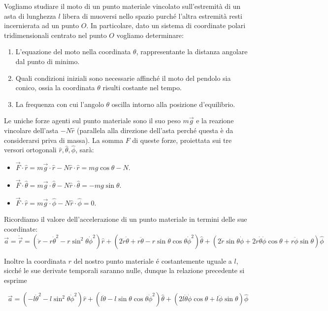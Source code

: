 \documentclass[../main.tex]{subfiles}
\begin{document}

\textex

Vogliamo studiare il moto di un punto materiale vincolato sull'estremità di un asta di lunghezza $l$ libera di muoversi nello spazio purché l'altra estremità resti incernierata ad un punto $O$.
In particolare, dato un sistema di coordinate polari tridimensionali centrato nel punto $O$ vogliamo determinare:
\begin{enumerate}
\item L'equazione del moto nella coordinata $\theta$, rappresentante la distanza angolare dal punto di minimo.
\item Quali condizioni iniziali sono necessarie affinché il moto del pendolo sia conico, ossia la coordinata $\theta$ risulti costante nel tempo.
\item La frequenza con cui l'angolo $\theta$ oscilla intorno alla posizione d'equilibrio.
\end{enumerate}

\solution
Le uniche forze agenti sul punto materiale sono il suo peso $m\vec{g}$ e la reazione vincolare dell'asta $-N\hat{r}$ (parallela alla direzione dell'asta perch\'e questa \`e da considerarsi priva di massa).
La somma $F$ di queste forze, proiettata sui tre versori ortogonali $\hat{r}, \hat{\theta}, \hat{\phi}$, sar\`a:
\begin{itemize}
 \item $\vec{F}\cdot\hat{r}=m\vec{g}\cdot\hat{r}-N\hat{r}\cdot\hat{r}=mg\cos\theta -N$.
 \item $\vec{F}\cdot\hat{\theta}=m\vec{g}\cdot\hat{\theta}-N\hat{r}\cdot\hat{\theta}=-mg\sin\theta$.
 \item $\vec{F}\cdot\hat{r}=m\vec{g}\cdot\hat{\phi}-N\hat{r}\cdot\hat{\phi}=0$.
\end{itemize}

Ricordiamo il valore dell'accelerazione di un punto materiale in termini delle sue coordinate:
$$ \vec{a}=\ddot{\vec{r}}=(\ddot{r}-r\dot{\theta}^2-r\sin^2{\theta}\dot{\phi}^2)\hat{r}+(2\dot{r}\dot{\theta}+r\ddot{\theta}-r\sin\theta\cos\theta\dot{\phi}^2)\hat{\theta}+(2\dot{r}\sin\theta\dot{\phi}+2r\dot{\theta}\dot{\phi}\cos\theta+r\ddot{\phi}\sin\theta)\hat{\phi} $$

Inoltre la coordinata $r$ del nostro punto materiale \'e costantemente uguale a $l$, sicch\'e le sue derivate temporali saranno nulle, dunque la relazione precedente si esprime

$$\vec{a}=(-l\dot{\theta}^2-l\sin^2{\theta}\dot{\phi}^2)\hat{r}+(l\ddot{\theta}-l\sin\theta\cos\theta\dot{\phi}^2)\hat{\theta}+(2l\dot{\theta}\dot{\phi}\cos\theta+l\ddot{\phi}\sin\theta)\hat{\phi}$$
\end{document}

